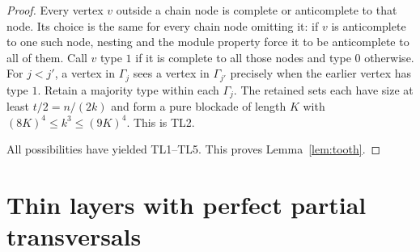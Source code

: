 \documentclass[11pt,a4paper]{article}
\theoremstyle{definition}
\theoremstyle{remark}
\numberwithin{equation}{section}
\begin{document}
\begin{proof}
Every vertex \(v\) outside a chain node is complete or anticomplete to that node. Its choice is the same for every chain node omitting it: if \(v\) is anticomplete to one such node, nesting and the module property force it to be anticomplete to all of them. Call \(v\) type \(1\) if it is complete to all those nodes and type \(0\) otherwise. For \(j<j'\), a vertex in \(\Gamma_{j}\) sees a vertex in \(\Gamma_{j'}\) precisely when the earlier vertex has type \(1\). Retain a majority type within each \(\Gamma_{j}\). The retained sets each have size at least \(t/2=n/(2k)\) and form a pure blockade of length \(K\) with \((8K)^{4}\le\allowbreak k^{3}\le\allowbreak (9K)^{4}\). This is TL2.

All possibilities have yielded TL1--TL5. This proves Lemma~\ref{lem:tooth}.
\end{proof}

\section{Thin layers with perfect partial transversals}\label{app:thin}
\end{document}
